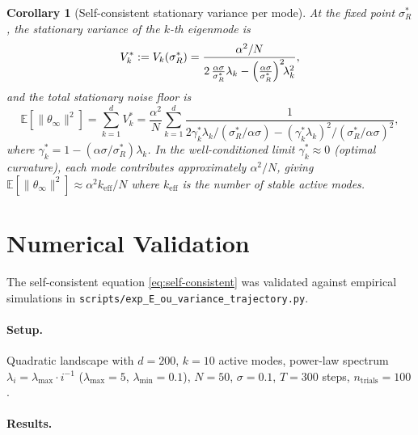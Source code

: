 \documentclass[american]{article}
\newtheorem{corollary}{Corollary}
\begin{document}
\begin{corollary}[Self-consistent stationary variance per mode]
\label{cor:stat-var}
At the fixed point $\sigma_R^*$, the stationary variance of the $k$-th eigenmode is
\begin{equation}
    V_k^* := V_k(\sigma_R^*)
    = \frac{\alpha^2/N}{2\,\frac{\alpha\sigma}{\sigma_R^*}\lambda_k
            - \Bigl(\frac{\alpha\sigma}{\sigma_R^*}\Bigr)^2\!\lambda_k^2},
\end{equation}
and the total stationary noise floor is
\begin{equation}
    \mathbb{E}[\|\theta_\infty\|^2]
    = \sum_{k=1}^d V_k^*
    = \frac{\alpha^2}{N} \sum_{k=1}^d
        \frac{1}{2\gamma^*_k\lambda_k/(\sigma_R^*/\alpha\sigma)
              - (\gamma^*_k\lambda_k)^2/(\sigma_R^*/\alpha\sigma)^2},
\end{equation}
where $\gamma^*_k = 1 - (\alpha\sigma/\sigma_R^*)\lambda_k$.
In the well-conditioned limit $\gamma^*_k \approx 0$ (optimal curvature),
each mode contributes approximately $\alpha^2/N$, giving
$\mathbb{E}[\|\theta_\infty\|^2] \approx \alpha^2 k_{\mathrm{eff}}/N$
where $k_{\mathrm{eff}}$ is the number of stable active modes.
\end{corollary}

\section*{Numerical Validation}

The self-consistent equation \eqref{eq:self-consistent} was validated against
empirical simulations in \texttt{scripts/exp\_E\_ou\_variance\_trajectory.py}.

\paragraph{Setup.} Quadratic landscape with $d=200$, $k=10$ active modes,
power-law spectrum $\lambda_i = \lambda_{\max}\cdot i^{-1}$ ($\lambda_{\max}=5$,
$\lambda_{\min}=0.1$), $N=50$, $\sigma=0.1$, $T=300$ steps, $n_{\mathrm{trials}}=100$.

\paragraph{Results.}
\end{document}
